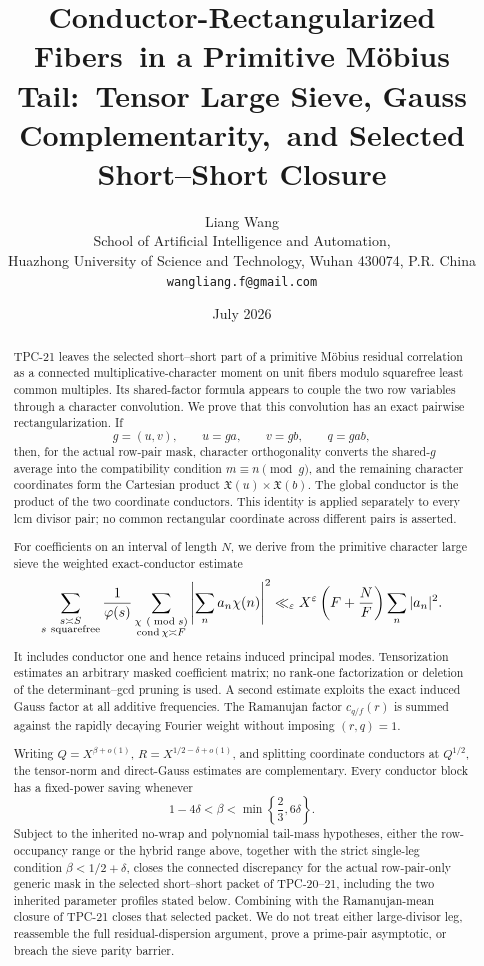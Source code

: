 \documentclass[11pt]{article}
\title{\textbf{Conductor-Rectangularized Fibers}\
\textbf{in a Primitive M\"obius Tail:}\
\textbf{Tensor Large Sieve, Gauss Complementarity,}\
\textbf{and Selected Short--Short Closure}}
\author{Liang Wang\\
\small School of Artificial Intelligence and Automation,\\[-0.2em]
\small Huazhong University of Science and Technology, Wuhan 430074, P.R. China\\
\small \texttt{wangliang.f@gmail.com}}
\date{July 2026}
\theoremstyle{definition}
\theoremstyle{remark}
\newcommand{\eps}{\varepsilon}
\newcommand{\cond}{\operatorname{cond}}
\begin{document}
\maketitle

\begin{abstract}
TPC-21 leaves the selected short--short part of a primitive M\"obius
residual correlation as a connected multiplicative-character moment on
unit fibers modulo squarefree least common multiples.  Its shared-factor
formula appears to couple the two row variables through a character
convolution.  We prove that this convolution has an exact pairwise
rectangularization.  If
\[
 g=(u,v),\qquad u=ga,\qquad v=gb,\qquad q=gab,
\]
then, for the actual row-pair mask, character orthogonality converts the
shared-\(g\) average into the compatibility condition
\(m\equiv n\pmod g\), and the remaining character coordinates form the
Cartesian product
\(\mathfrak X(u)\times\mathfrak X(b)\).  The global conductor is the
product of the two coordinate conductors.  This identity is applied
separately to every lcm divisor pair; no common rectangular coordinate
across different pairs is asserted.

For coefficients on an interval of length \(N\), we derive from the
primitive character large sieve the weighted exact-conductor estimate
\[
 \sum_{\substack{s\asymp S\\s\ {\rm squarefree}}}\frac1{\varphi(s)}
 \sum_{\substack{\chi\ (\bmod s)\\\cond\chi\asymp F}}
 \left|\sum_n a_n\chi(n)\right|^2
 \ll_\eps X^\eps\left(F+\frac NF\right)\sum_n|a_n|^2.
\]
It includes conductor one and hence retains induced principal modes.
Tensorization estimates an arbitrary masked coefficient matrix; no
rank-one factorization or deletion of the determinant--gcd pruning is
used.  A second estimate exploits the exact induced Gauss factor at all
additive frequencies.  The Ramanujan factor \(c_{q/f}(r)\) is summed
against the rapidly decaying Fourier weight without imposing
\((r,q)=1\).

Writing \(Q=X^{\beta+o(1)}\),
\(R=X^{1/2-\delta+o(1)}\), and splitting coordinate conductors at
\(Q^{1/2}\), the tensor-norm and direct-Gauss estimates are
complementary.  Every conductor block has a fixed-power saving whenever
\[
 1-4\delta<\beta<\min\left\{\frac23,6\delta\right\}.
\]
Subject to the inherited no-wrap and polynomial tail-mass hypotheses,
either the row-occupancy range or the hybrid range above, together with
the strict single-leg condition \(\beta<1/2+\delta\), closes the connected
discrepancy for the actual row-pair-only generic mask in the selected
short--short packet of TPC-20--21, including the two inherited parameter
profiles stated below.
Combining with the Ramanujan-mean closure of TPC-21 closes that selected
packet.  We do not treat either large-divisor leg, reassemble the full
residual-dispersion argument, prove a prime-pair asymptotic, or breach the
sieve parity barrier.
\end{abstract}
\end{document}
